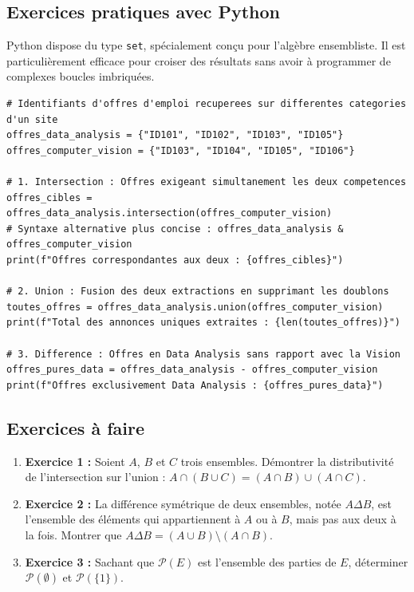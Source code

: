 \documentclass[12pt,a4paper]{report}
\begin{document}
\subsection{Exercices pratiques avec Python}
Python dispose du type \texttt{set}, spécialement conçu pour l'algèbre ensembliste. Il est particulièrement efficace pour croiser des résultats sans avoir à programmer de complexes boucles imbriquées.

\begin{lstlisting}
# Identifiants d'offres d'emploi recuperees sur differentes categories d'un site
offres_data_analysis = {"ID101", "ID102", "ID103", "ID105"}
offres_computer_vision = {"ID103", "ID104", "ID105", "ID106"}

# 1. Intersection : Offres exigeant simultanement les deux competences
offres_cibles = offres_data_analysis.intersection(offres_computer_vision)
# Syntaxe alternative plus concise : offres_data_analysis & offres_computer_vision
print(f"Offres correspondantes aux deux : {offres_cibles}")

# 2. Union : Fusion des deux extractions en supprimant les doublons
toutes_offres = offres_data_analysis.union(offres_computer_vision)
print(f"Total des annonces uniques extraites : {len(toutes_offres)}")

# 3. Difference : Offres en Data Analysis sans rapport avec la Vision
offres_pures_data = offres_data_analysis - offres_computer_vision
print(f"Offres exclusivement Data Analysis : {offres_pures_data}")
\end{lstlisting}

\subsection{Exercices à faire}
\begin{enumerate}
    \item \textbf{Exercice 1 :} Soient $A$, $B$ et $C$ trois ensembles. Démontrer la distributivité de l'intersection sur l'union : $A \cap (B \cup C) = (A \cap B) \cup (A \cap C)$.
    \item \textbf{Exercice 2 :} La différence symétrique de deux ensembles, notée $A \Delta B$, est l'ensemble des éléments qui appartiennent à $A$ ou à $B$, mais pas aux deux à la fois. Montrer que $A \Delta B = (A \cup B) \setminus (A \cap B)$.
    \item \textbf{Exercice 3 :} Sachant que $\mathcal{P}(E)$ est l'ensemble des parties de $E$, déterminer $\mathcal{P}(\emptyset)$ et $\mathcal{P}(\{1\})$.
\end{enumerate}
\end{document}
